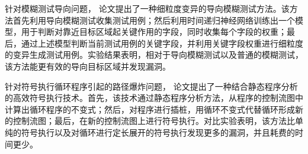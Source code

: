 \begin{cabstract}
针对模糊测试导向问题，
论文提出了一种细粒度变异的导向模糊测试方法。该方法首先利用导向模糊测试收集测试用例；然后利用时间递归神经网络训练出一个模型，用于判断对靠近目标区域起关键作用的字段，同时收集每个字段的权重；最后，通过上述模型判断当前测试用例的关键字段，并利用关键字段权重进行细粒度的变异生成测试用例。实验结果表明，相对于导向模糊测试以及普通的模糊测试，该方法能更有效的导向目标区域并发现漏洞。

针对符号执行循环程序引起的路径爆炸问题，
论文提出了一种结合静态程序分析的高效符号执行技术。首先，该技术通过静态程序分析方法，从程序的控制流图中计算出循环程序的不变式；然后，对程序进行插桩，用循环不变式代替循环形成新的控制流图；最后，在新的控制流图上进行符号执行。对比实验表明，该方法比单纯的符号执行以及对循环进行定长展开的符号执行发现更多的漏洞，并且耗费的时间更少。

\end{cabstract}

